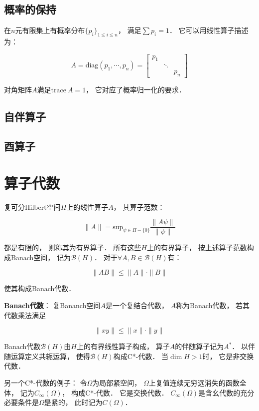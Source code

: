 \documentclass[10pt, openany]{book}
\begin{document}
\section{概率的保持}

在$n$元有限集上有概率分布$\{p_i\}_{1 \leq i \leq n}$，
满足$\sum p_i = 1$．
它可以用线性算子描述为：

$$
A = \text{diag}(p_1,\cdots,p_n) 
= \begin{bmatrix}
p_1 & & \\ & \ddots & \\ & & p_n
\end{bmatrix}
$$

对角矩阵$A$满足$\text{trace} \ A = 1$，
它对应了概率归一化的要求．

\section{自伴算子}

\section{酉算子}

\chapter{算子代数}

复可分Hilbert空间$H$上的线性算子$A$，
其算子范数：

$$
\|A\| = \text{sup}_{\psi \in H - \{0\}} \frac{\|A \psi\|}{\|\psi\|}
$$

都是有限的，
则称其为有界算子．
所有这些$H$上的有界算子，
按上述算子范数构成Banach空间，
记为$\mathcal B(H)$．
对于$\forall A,B \in \mathcal B(H)$有：

$$
\|AB\| \leq \|A\|\cdot\|B\|
$$

使其构成Banach代数．

\textbf{Banach代数}：
复Bananch空间$A$是一个复结合代数，
$A$称为Banach代数，
若其代数乘法满足

$$
\|xy\| \leq \|x\|\cdot\|y\|
$$

Banach代数$\mathcal B(H)$由$H$上的有界线性算子构成，
算子$A$的伴随算子记为$A^*$．
以伴随运算定义共轭运算，
使得$\mathcal B(H)$构成C*-代数．
当$\dim H > 1$时，
它是非交换代数．

另一个C*-代数的例子：
令$\Omega$为局部紧空间，
$\Omega$上复值连续无穷远消失的函数全体，
记为$C_\infty(\Omega)$，
构成C*-代数．
它是交换代数．
$C_\infty(\Omega)$是含幺代数的充分必要条件是$\Omega$是紧的，
此时记为$C(\Omega)$．
\end{document}
